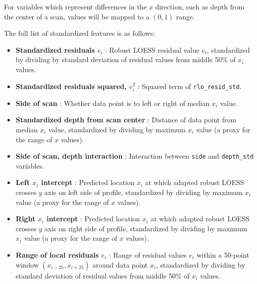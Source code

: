 \documentclass[12pt]{article}
\begin{document}
For variables which represent differences in the \(x\) direction, such
as depth from the center of a scan, values will be mapped to a
\((0, 1)\) range.

The full list of standardized features is as follows:

\begin{itemize}

\item[] \textbf{Standardized residuals $e_i$} {}: Robust LOESS residual value $e_i$, standardized by dividing by standard deviation of residual values from middle 50\% of $x_i$ values.  

\item[] \textbf{Standardized residuals squared, $e_i^2$} {}: Squared term of \texttt{rlo\_resid\_std}.   

\item[] \textbf{Side of scan} {}: Whether data point is to left or right of median $x_i$ value.  

\item[] \textbf{Standardized depth from scan center} {}: Distance of data point from median $x_i$ value, standardized by dividing by maximum $x_i$ value (a proxy for the range of $x$ values).  

\item[] \textbf{Side of scan, depth interaction} {}: Interaction between \texttt{side} and \texttt{depth\_std} variables.  

\item[] \textbf{Left $x_i$ intercept} {}: Predicted location $x_i$ at which adapted robust LOESS crosses $y$ axis on left side of profile, standardized by dividing by maximum $x_i$ value (a proxy for the range of $x$ values).  

\item[] \textbf{Right $x_i$ intercept} {}: Predicted location $x_i$ at which adapted robust LOESS crosses $y$ axis on right side of profile, standardized by dividing by maximum $x_i$ value (a proxy for the range of $x$ values).  

\item[] \textbf{Range of local residuals $e_i$} {}: Range of residual values $e_i$ within a 50-point window $(x_{i-25}, x_{i+25})$ around data point $x_i$, standardized by dividing by standard deviation of residual values from middle 50\% of $x_i$ values.  


\end{itemize}
\end{document}
